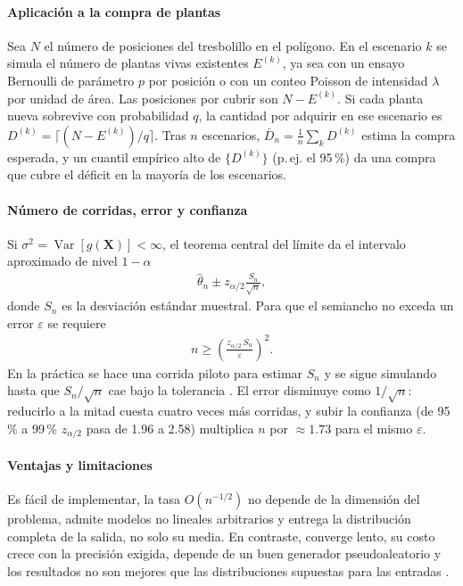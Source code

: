 \paragraph{Aplicación a la compra de plantas} Sea $N$ el número de posiciones del tresbolillo en el polígono. En el escenario $k$ se simula el número de plantas vivas existentes $E^{(k)}$, ya sea con un ensayo Bernoulli de parámetro $p$ por posición o con un conteo Poisson de intensidad $\lambda$ por unidad de área. Las posiciones por cubrir son $N-E^{(k)}$. Si cada planta nueva sobrevive con probabilidad $q$, la cantidad por adquirir en ese escenario es $D^{(k)}=\lceil (N-E^{(k)})/q\rceil$. Tras $n$ escenarios, $\bar{D}_n=\frac{1}{n}\sum_k D^{(k)}$ estima la compra esperada, y un cuantil empírico alto de $\{D^{(k)}\}$ (p.\,ej. el 95\,\%) da una compra que cubre el déficit en la mayoría de los escenarios.

\paragraph{Número de corridas, error y confianza} Si $\sigma^2=\operatorname{Var}[g(\mathbf{X})]<\infty$, el teorema central del límite da el intervalo aproximado de nivel $1-\alpha$
\begin{align}
    \hat{\theta}_n\pm z_{\alpha/2}\frac{S_n}{\sqrt{n}},
\end{align}
donde $S_n$ es la desviación estándar muestral. Para que el semiancho no exceda un error $\varepsilon$ se requiere
\begin{align}
    n\geq\left(\frac{z_{\alpha/2}\,S_n}{\varepsilon}\right)^2.
\end{align}
En la práctica se hace una corrida piloto para estimar $S_n$ y se sigue simulando hasta que $S_n/\sqrt{n}$ cae bajo la tolerancia \autocite{:ross2013}. El error disminuye como $1/\sqrt{n}$: reducirlo a la mitad cuesta cuatro veces más corridas, y subir la confianza (de 95\,\% a 99\,\% $z_{\alpha/2}$ pasa de 1.96 a 2.58) multiplica $n$ por $\approx1.73$ para el mismo $\varepsilon$.

\paragraph{Ventajas y limitaciones} Es fácil de implementar, la tasa $O(n^{-1/2})$ no depende de la dimensión del problema, admite modelos no lineales arbitrarios y entrega la distribución completa de la salida, no solo su media. En contraste, converge lento, su costo crece con la precisión exigida, depende de un buen generador pseudoaleatorio y los resultados no son mejores que las distribuciones supuestas para las entradas \autocite{:robert2004}.

